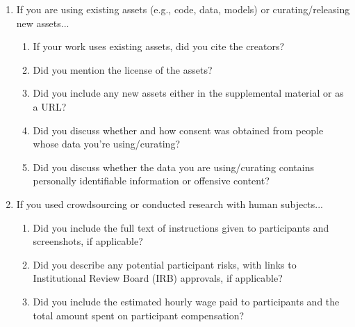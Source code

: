 \begin{enumerate}
\item If you are using existing assets (e.g., code, data, models) or curating/releasing new assets...
\begin{enumerate}
  \item If your work uses existing assets, did you cite the creators?
    \answerYes{}
  \item Did you mention the license of the assets?
    \answerNo{}
  \item Did you include any new assets either in the supplemental material or as a URL?
    \answerNo{}
  \item Did you discuss whether and how consent was obtained from people whose data you're using/curating?
    \answerNA{}
  \item Did you discuss whether the data you are using/curating contains personally identifiable information or offensive content?
    \answerNA{}
\end{enumerate}

\item If you used crowdsourcing or conducted research with human subjects...
\begin{enumerate}
  \item Did you include the full text of instructions given to participants and screenshots, if applicable?
    \answerNA{}
  \item Did you describe any potential participant risks, with links to Institutional Review Board (IRB) approvals, if applicable?
    \answerNA{}
  \item Did you include the estimated hourly wage paid to participants and the total amount spent on participant compensation?
    \answerNA{}
\end{enumerate}

\end{enumerate}
